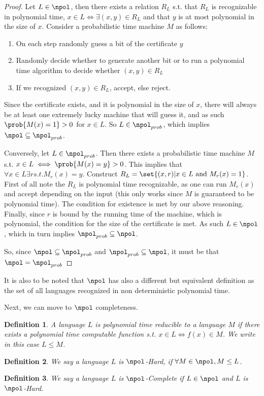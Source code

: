 \documentclass{article}
\newtheorem{definition}{Definition}
\begin{document}
\begin{proof}
    Let $L \in \npol$, then there exists a relation $R_L$ s.t. that $R_L$ is recognizable in polynomial time, $x \in L \iff \exists (x, y) \in R_L$ and that $y$ is at most polynomial in the size of $x$. Consider a probabilistic time machine $M$ as follows:
    \begin{enumerate}
        \item On each step randomly guess a bit of the certificate $y$
        \item Randomly decide whether to generate another bit or to run a polynomial time algorithm to decide whether $(x, y) \in R_L$
        \item If we recognized $(x, y) \in R_L$, accept, else reject.
    \end{enumerate}

    Since the certificate exists, and it is polynomial in the size of $x$, there will always be at least one extremely lucky machine that will guess it, and as such $\prob{M(x) = 1} > 0$ for $x \in L$. So $L \in \npol_{prob}$, which implies $\npol \subseteq \npol_{prob}$.

    Conversely, let $L \in \npol_{prob}$. Then there exists a probabilistic time machine $M$ s.t. $x \in L \iff \prob{M(x) = y} > 0$. This implies that $\forall x \in L\exists r s.t. M_r(x) = y$. Construct $R_L = \set{ (x, r) | x \in L \text { and } M_r(x) = 1 }$. First of all note the $R_L$ is polynomial time recognizable, as one can run $M_r(x)$ and accept depending on the input (this only works since $M$ is guaranteed to be polynomial time). The condition for existence is met by our above reasoning. Finally, since $r$ is bound by the running time of the machine, which is polynomial, the condition for the size of the certificate is met. As such $L \in \npol$, which in turn implies $\npol_{prob} \subseteq \npol$. \par

    So, since $\npol \subseteq \npol_{prob}$ and $\npol_{prob} \subseteq \npol$, it must be that $\npol = \npol_{prob}$


\end{proof}

It is also to be noted that $\npol$ has also a different but equivalent definition as the set of all languages recognized in non deterministic polynomial time. \par

Next, we can move to $\npol$ completeness.
\begin{definition}
    A language $L$ is polynomial time reducible to a language $M$ if there exists a polynomial time computable function s.t. $x \in L \iff f(x) \in M$. We write in this case $L \leq M$.
\end{definition}
\begin{definition}
    We say a language $L$ is $\npol$-Hard, if $\forall M \in \npol, M \leq L$.
\end{definition}
\begin{definition}
    We say a language $L$ is $\npol$-Complete if $L \in \npol$ and $L$ is $\npol$-Hard.
\end{definition}
\end{document}
